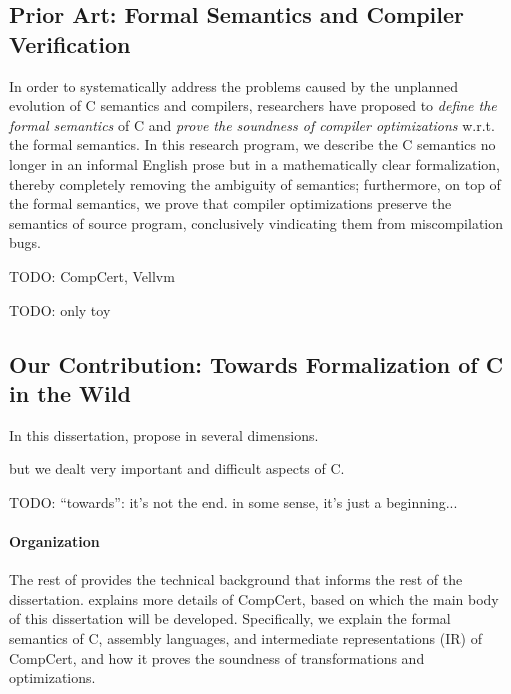 \subsection{Prior Art: Formal Semantics and Compiler Verification}

In order to systematically address the problems caused by the unplanned evolution of C semantics and
compilers, researchers have proposed to \emph{define the formal semantics} of C and \emph{prove the
  soundness of compiler optimizations} w.r.t. the formal semantics.  In this research program, we
describe the C semantics no longer in an informal English prose but in a mathematically clear
formalization, thereby completely removing the ambiguity of semantics; furthermore, on top of the
formal semantics, we prove that compiler optimizations preserve the semantics of source program,
conclusively vindicating them from miscompilation bugs.

TODO: CompCert, Vellvm

TODO: only toy


\subsection{Our Contribution: Towards Formalization of C in the Wild}

In this dissertation, propose in several dimensions.

but we dealt very important and difficult aspects of C.


TODO: ``towards'': it's not the end.  in some sense, it's just a beginning...



\paragraph{Organization}

The rest of  provides the technical background that informs the rest of the
dissertation.   explains more details of CompCert, based on which the main body
of this dissertation will be developed.  Specifically, we explain the formal semantics of C,
assembly languages, and intermediate representations (IR) of CompCert, and how it proves the
soundness of transformations and optimizations.

\paragraph*{}

